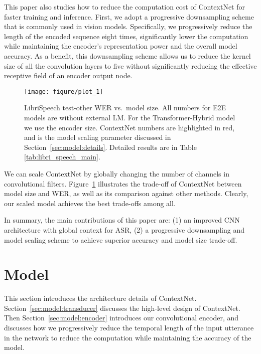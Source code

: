 \documentclass[a4paper]{article}
\newcommand{\netname}{ContextNet}
\begin{document}
This paper also studies how to reduce the computation cost of \netname{} for faster training and inference. First, we adopt a progressive downsampling scheme that is commonly used in vision models. Specifically, we progressively reduce the length of the encoded sequence eight times, significantly lower the computation while maintaining the encoder's representation power and the overall model accuracy. As a benefit, this downsampling scheme allows us to reduce the kernel size of all the convolution layers to five without significantly reducing the effective receptive field of an encoder output node.

\begin{figure}[t]
\begin{centering}
\texttt{[image: figure/plot\_1]}
\par\end{centering}
\caption{LibriSpeech test-other WER vs.\ model size. All numbers for E2E models are without external LM. For the Transformer-Hybrid model we use the encoder size. \netname{} numbers are highlighted in red, and  is the model scaling parameter discussed in Section~\ref{sec:model:details}. Detailed results are in Table \ref{tab:libri_speech_main}.}
\label{overall}
\end{figure}

We can scale \netname{} by globally changing the number of channels in convolutional filters. Figure~\ref{overall} illustrates the trade-off of {\netname} between model size and WER, as well as its comparison against other methods. Clearly, our scaled model achieves the best trade-offs among all.

In summary, the main contributions of this paper are: (1) an improved CNN architecture with global context for ASR, (2) a progressive downsampling and model scaling scheme to achieve superior accuracy and model size trade-off. \vspace{-0.05in}
\section{Model}
\vspace{-0.05in}
This section introduces the architecture details of \netname. Section~\ref{sec:model:transducer} discusses the high-level design of \netname. Then Section~\ref{sec:model:encoder} introduces our convolutional encoder, and discusses how we progressively reduce the temporal length of the input utterance in the network to reduce the computation while maintaining the accuracy of the model.  
\vspace{-0.05in}
\end{document}
